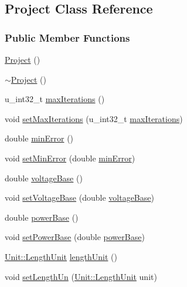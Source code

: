 \hypertarget{class_project}{}\subsection{Project Class Reference}
\label{class_project}
\subsubsection*{Public Member Functions}
\begin{DoxyCompactItemize}
\item 
\hyperlink{class_project_aa007ecd17d5bc800e7a956cf666eea21}{Project} ()
\item 
\hyperlink{class_project_ad165d61b76ee86ee9c27fd987a2a7b9e}{$\sim$\+Project} ()
\item 
u\+\_\+int32\+\_\+t \hyperlink{class_project_ad85e1754cbab65e20f269e79c5caa789}{max\+Iterations} ()
\item 
void \hyperlink{class_project_abac6e194d2d16fbdbe51627844eae60b}{set\+Max\+Iterations} (u\+\_\+int32\+\_\+t \hyperlink{class_project_ad85e1754cbab65e20f269e79c5caa789}{max\+Iterations})
\item 
double \hyperlink{class_project_a457ed8d3b0ea5816f928977509f69a34}{min\+Error} ()
\item 
void \hyperlink{class_project_a2cb776c39adb42a1113bf7887d0d4636}{set\+Min\+Error} (double \hyperlink{class_project_a457ed8d3b0ea5816f928977509f69a34}{min\+Error})
\item 
double \hyperlink{class_project_a4e857ccb6162f57f5d72f4e7199e4573}{voltage\+Base} ()
\item 
void \hyperlink{class_project_a494c3e89851f754188c7abaedbf77ef6}{set\+Voltage\+Base} (double \hyperlink{class_project_a4e857ccb6162f57f5d72f4e7199e4573}{voltage\+Base})
\item 
double \hyperlink{class_project_a1a417c6832182389fb501b92cade3f9d}{power\+Base} ()
\item 
void \hyperlink{class_project_abb4df805b3cd3af509a41e657eb4bb83}{set\+Power\+Base} (double \hyperlink{class_project_a1a417c6832182389fb501b92cade3f9d}{power\+Base})
\item 
\hyperlink{class_unit_a8c8921f7b225ad6063b1cb573425b9a0}{Unit\+::\+Length\+Unit} \hyperlink{class_project_a40cd2f59a4a708897e5997942c046f4d}{length\+Unit} ()
\item 
void \hyperlink{class_project_a846ee2284b0856d461b35d78d9f8e1d6}{set\+Length\+Un} (\hyperlink{class_unit_a8c8921f7b225ad6063b1cb573425b9a0}{Unit\+::\+Length\+Unit} unit)

\end{DoxyCompactItemize}

